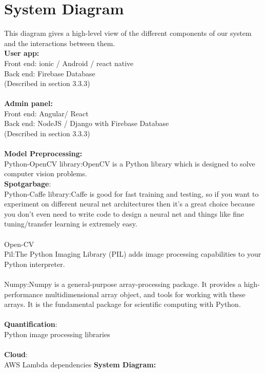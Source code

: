 \section{System Diagram}
This diagram gives a high-level view of the different components of our system and the interactions between them.\\
\textbf{User  app:}\\
Front end: ionic / Android / react native\\
Back end: Firebase Database\\
(Described in section 3.3.3)\\
\\
\textbf{Admin panel:}\\
Front end: Angular/ React\\
Back end: NodeJS / Django with Firebase Database\\
(Described in section 3.3.3)\\
\\
\textbf{Model Preprocessing:}\\
Python-OpenCV library:OpenCV is a Python library which is designed to solve computer vision problems.
\\
\textbf{Spotgarbage}:\\
Python-Caffe library:Caffe is good for fast training and testing, so if you want to experiment on different neural net architectures then it's a great choice because you don't even need to write code to design a neural net and things like fine tuning/transfer learning is extremely easy.\\
\\
Open-CV
\\
Pil:The Python Imaging Library (PIL) adds image processing capabilities to your Python interpreter.\\
\\
Numpy:Numpy is a general-purpose array-processing package. It provides a high-performance multidimensional array object, and tools for working with these arrays. It is the fundamental package for scientific computing with Python.\\
\\
\textbf{Quantification}: \\
Python image processing libraries\\
\\
\textbf{Cloud}:\\
AWS Lambda dependencies
\newpage
\textbf{System Diagram:}\\
\\
